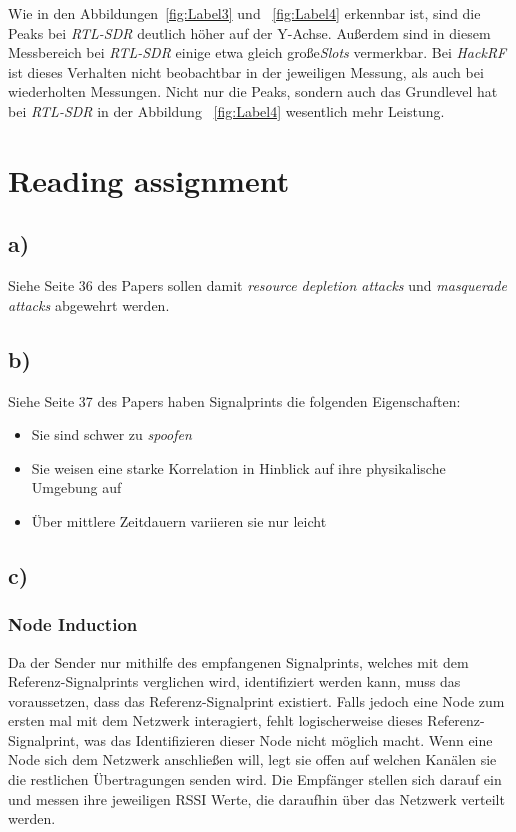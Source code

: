 \documentclass[12pt,a4paper]{article}
\begin{document}
Wie in den Abbildungen~\ref{fig:Label3} und ~\ref{fig:Label4}
erkennbar ist, sind die Peaks bei \textit{RTL-SDR} deutlich 
höher auf der Y-Achse. Außerdem sind in diesem Messbereich bei
\textit{RTL-SDR} einige etwa gleich große\textit{Slots} 
vermerkbar. Bei \textit{HackRF} ist dieses Verhalten nicht 
beobachtbar in der jeweiligen Messung, als auch bei 
wiederholten Messungen. Nicht nur die Peaks, sondern auch das 
Grundlevel hat bei \textit{RTL-SDR} in der Abbildung 
~\ref{fig:Label4} wesentlich mehr Leistung.


\newpage
\section{Reading assignment}

\subsection*{a)} 
Siehe Seite 36 des Papers sollen damit \textit{resource 
depletion attacks} und \textit{masquerade attacks} 
abgewehrt werden.


\subsection*{b)} 
Siehe Seite 37 des Papers haben Signalprints die folgenden 
Eigenschaften:

\begin{itemize}
	\item Sie sind schwer zu \textit{spoofen} 
	\item Sie weisen eine starke Korrelation in Hinblick auf ihre 
	physikalische Umgebung auf
	\item Über mittlere Zeitdauern variieren sie nur leicht 
\end{itemize}


\subsection*{c)} 

\subsubsection*{Node Induction}
Da der Sender nur mithilfe des empfangenen Signalprints,
welches mit dem Referenz-Signalprints verglichen wird, 
identifiziert werden kann, muss das voraussetzen, dass 
das Referenz-Signalprint existiert. Falls jedoch eine 
Node zum ersten mal mit dem Netzwerk interagiert, fehlt 
logischerweise dieses Referenz-Signalprint, was das 
Identifizieren dieser Node nicht möglich macht. 
Wenn eine Node sich dem Netzwerk anschließen will, legt 
sie offen auf welchen Kanälen sie die restlichen 
Übertragungen senden wird. Die Empfänger stellen sich 
darauf ein und messen ihre jeweiligen RSSI Werte, die 
daraufhin über das Netzwerk verteilt werden. 
\end{document}
